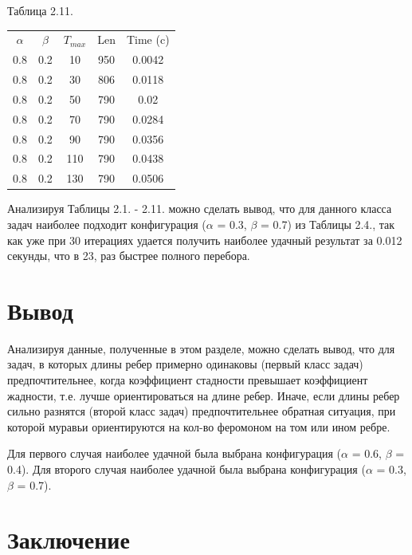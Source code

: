 \documentclass[12pt]{report}
\begin{document}
	\begin{center}
		Таблица 2.11.
		
		\begin{tabular}{|c c c c c|}
			\hline
			$\alpha$ & $\beta$ & $T_{max}$ & Len & Time (c) \\ [0.5ex]
			0.8 & 0.2 & 10 & 950 & 0.0042 \\ 
			\hline 
			0.8 & 0.2 & 30 & 806 & 0.0118 \\ 
			\hline 
			0.8 & 0.2 & 50 & 790 & 0.02 \\ 
			\hline 
			0.8 & 0.2 & 70 & 790 & 0.0284 \\ 
			\hline 
			0.8 & 0.2 & 90 & 790 & 0.0356 \\ 
			\hline 
			0.8 & 0.2 & 110 & 790 & 0.0438 \\ 
			\hline 
			0.8 & 0.2 & 130 & 790 & 0.0506 \\ 
			\hline 
		\end{tabular}
	\end{center}
			
	Анализируя Таблицы 2.1. - 2.11. можно сделать вывод, что для данного класса задач наиболее подходит конфигурация ($\alpha$ = 0.3, $\beta$ = 0.7) из Таблицы 2.4., так как уже при 30 итерациях удается получить наиболее удачный результат за 0.012 секунды, что в 23, раз быстрее полного перебора.
	
	\chapter*{Вывод}
	
	Анализируя данные, полученные в этом разделе, можно сделать вывод, что для задач, в которых длины ребер примерно одинаковы (первый класс задач) предпочтительнее, когда коэффициент стадности превышает коэффициент жадности, т.е. лучше ориентироваться на длине ребер.
	Иначе, если длины ребер сильно разнятся (второй класс задач) предпочтительнее обратная ситуация, при которой муравьи ориентируются на кол-во феромоном на том или ином ребре.
	
	Для первого случая наиболее удачной была выбрана конфигурация ($\alpha$ = 0.6, $\beta$ = 0.4).
	Для второго случая наиболее удачной была выбрана конфигурация ($\alpha$ = 0.3, $\beta$ = 0.7).
	
	
	\chapter*{Заключение}
	
\end{document}
